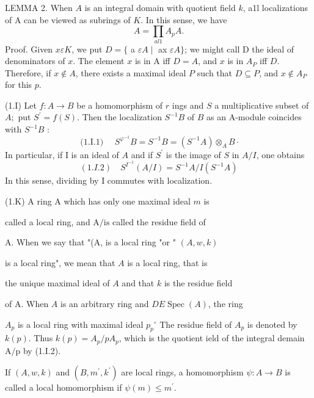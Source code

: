 LEMMA 2. When $A$ is an integral domain with quotient field $k$, a1l localizations of A can be viewed as subrings of $K$. In this sense, we have
$$
A=\prod_{a l 1} A_{p} A .
$$
Proof. Given $x \varepsilon K$, we put $D=\{$ a $\varepsilon A \mid$ ax $\varepsilon A\}$; we might call D the ideal of denominators of $x$. The element $x$ is in A iff $D=A$, and $x$ is in $A_{P}$ iff $D$. Therefore, if $x \notin A$, there exists a maximal ideal $P$ such that $D \subseteq P$, and $x \notin A_{P}$ for this $p$.

(1.I) Let $f: A \rightarrow B$ be a homomorphism of $r$ ings and $S$ a multiplicative subset of $A ;$ put $S^{\prime}=f(S)$. Then the localization $S^{-1} B$ of $B$ as an A-module coincides with $S^{-1} B$ :
$$
\text { (1.I.1) } \quad S^{\varphi^{-1}} B=S^{-1} B=\left(S^{-1} A\right) \otimes_{A} B \cdot
$$
In particular, if I is an ideal of $A$ and if $S^{\prime}$ is the image of $S$ in $A / I$, one obtains
$$
(1 . I .2) \quad S^{I^{-1}}(A / I)=S^{-1} A / I\left(S^{-1} A\right)
$$
In this sense, dividing by I commutes with localization.

(1.K) A ring A which has only one maximal ideal $m$ is

called a local ring, and $\mathrm{A} / \mathrm{is}$ called the residue field of

A. When we say that "(A, is a local ring "or " $(A, w, k)$

is a local ring", we mean that $A$ is a local ring, that is

the unique maximal ideal of $A$ and that $k$ is the residue field

of A. When $A$ is an arbitrary ring and $D E \operatorname{Spec}(A)$, the ring

$A_{p}$ is a local ring with maximal ideal $p_{p}{ }^{\circ}$ The residue field of $A_{p}$ is denoted by $k(p)$. Thus $k(p)=A_{p} / p A_{p}$, which is the quotient ield of the integral demain $\mathrm{A} / \mathrm{p}$ by (1.I.2).

If $(A, w, k)$ and $\left(B, m^{\prime}, k^{\prime}\right)$ are local rings, a homomorphism $\psi: A \rightarrow B$ is called a local homomorphism if $\psi(m) \leq m^{\prime}$.

